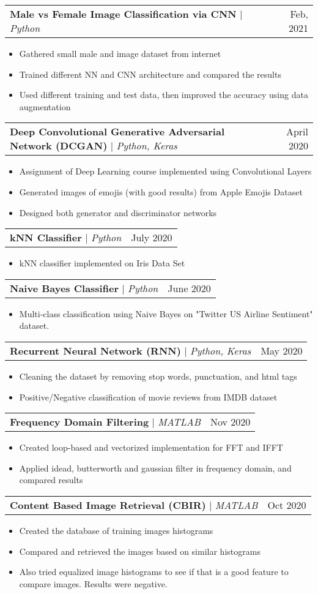 \documentclass[letterpaper,11pt]{article}
\makeatletter
\newcommand{\resumeItem}[1]{
  \item\small{
    {#1 \vspace{-2pt}}
  }
}
\newcommand{\resumeProjectHeading}[2]{
    \item
    \begin{tabular*}{0.97\textwidth}{l@{\extracolsep{\fill}}r}
      \small#1 & #2 \\
    \end{tabular*}\vspace{-7pt}
}
\newcommand{\resumeItemListStart}{\begin{itemize}}
\newcommand{\resumeItemListEnd}{\end{itemize}\vspace{-5pt}}
\makeatother
\begin{document}
      \resumeProjectHeading
          {\textbf{Male vs Female Image Classification via CNN} $|$ \emph{Python}}{Feb, 2021}
          \resumeItemListStart
            \resumeItem{Gathered small male and image dataset from internet}
            \resumeItem{Trained different NN and CNN architecture and compared the results}
            \resumeItem{Used different training and test data, then improved the accuracy using data augmentation}
          \resumeItemListEnd
    
      \resumeProjectHeading
          {\textbf{Deep Convolutional Generative Adversarial Network (DCGAN)} $|$ \emph{Python, Keras}}{April 2020}
          \resumeItemListStart
            \resumeItem{Assignment of Deep Learning course implemented using Convolutional Layers}
            \resumeItem{Generated images of emojis (with good results) from Apple Emojis Dataset}
            \resumeItem{Designed both generator and discriminator networks}
          \resumeItemListEnd
          
      \resumeProjectHeading
          {\textbf{kNN Classifier} $|$ \emph{Python}}{July 2020}
          \resumeItemListStart
            \resumeItem{kNN classifier implemented on Iris Data Set}
          \resumeItemListEnd
          
      \resumeProjectHeading
          {\textbf{Naive Bayes Classifier} $|$ \emph{Python}}{June 2020}
          \resumeItemListStart
            \resumeItem{Multi-class classification using Naive Bayes on "Twitter US Airline Sentiment" dataset.}
          \resumeItemListEnd          
          
      \resumeProjectHeading
          {\textbf{Recurrent Neural Network (RNN)} $|$ \emph{Python, Keras}}{May 2020}
          \resumeItemListStart
            \resumeItem{Cleaning the dataset by removing stop words, punctuation, and html tags}
            \resumeItem{Positive/Negative classification of movie reviews from IMDB dataset}
          \resumeItemListEnd

      \resumeProjectHeading
          {\textbf{Frequency Domain Filtering} $|$ \emph{MATLAB}}{Nov 2020}
          \resumeItemListStart
            \resumeItem{Created loop-based and vectorized implementation for FFT and IFFT}
            \resumeItem {Applied idead, butterworth and gaussian filter in frequency domain, and compared results}
          \resumeItemListEnd
         
      \resumeProjectHeading
          {\textbf{Content Based Image Retrieval (CBIR)} $|$ \emph{MATLAB}}{Oct 2020}
          \resumeItemListStart
            \resumeItem{Created the database of training images histograms}
            \resumeItem {Compared and retrieved the images based on similar histograms}
            \resumeItem{Also tried equalized image histograms to see if that is a good feature to compare images. Results were negative.}
          \resumeItemListEnd         
\end{document}
